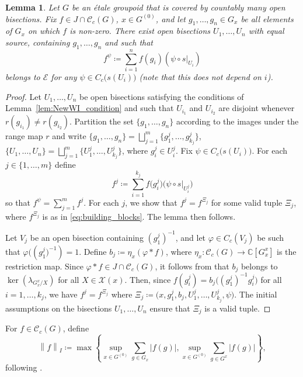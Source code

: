 \documentclass[11pt, oneside, reqno]{amsart}
\newcommand{\Gu}{G^{(0)}}
\newcommand{\cg}{\mathscr{C}_c(G)}
\newcommand{\abs}[1]{\left\vert#1\right\vert}
\newcommand{\norm}[1]{\left\|#1\right\|}
\newtheorem{lem}[thm]{Lemma}
\theoremstyle{definition}
\theoremstyle{remark}
\numberwithin{equation}{section}
\begin{document}
\begin{lem}\label{lem:RestrictJcg}
    Let $G$ be an \'etale groupoid that is covered by countably many open bisections.
    Fix $f \in J \cap \cg$, $x \in \Gu$, and let $g_1, \dotsc, g_n \in G_{x}$ be all elements of $G_{x}$ on which $f$ is non-zero. There exist open bisections $U_1, \dots, U_n$ with equal source, containing $g_1, \dots, g_n$ and such that
    \[
    f^\psi \coloneq \sum_{i = 1}^n f(g_i) (\psi \circ s \vert_{U_i})
    \]
    belongs to $\mathcal{E}$ for any $\psi \in C_c\big(s(U_i)\big)$ (note that this does not depend on $i$).
\end{lem}

\begin{proof}
    Let $U_1, \dots, U_n$ be open bisections satisfying the conditions of Lemma~\ref{lem:NewWI_condition} and such that $U_{i_1}$ and $U_{i_2}$ are disjoint whenever $r(g_{i_1}) \neq r(g_{i_2})$. Partition the set $\{g_1, \dots, g_n\}$ according to the images under the range map $r$ and write $\{g_1, \dots, g_n\} = \bigsqcup_{j=1}^m \{g^j_1, \dots, g^j_{k_j}\}$, $\{U_1, \dots, U_n\} = \bigsqcup_{j=1}^m \{U^j_1, \dots, U^j_{k_j}\}$, where $g_i^j \in U_i^j$. Fix $\psi \in C_c\big(s(U_i)\big)$. For each $j \in \{1, \dots, m\}$ define
    \[
    f^j \coloneq \sum_{i = 1}^{k_j} f\big( g^j_i \big) \big(\psi \circ s \vert_{U^j_i}\big)
    \]
    so that $f^{\psi} = \sum_{j=1}^m f^j$. For each $j$, we show that $f^j = f^{\Xi_j}$ for some valid tuple $\Xi_j$, where $f^{\Xi_j}$ is as in \eqref{eq:building_blocks}. The lemma then follows.
    
    Let $V_j$ be an open bisection containing ${(g^j_1)}^{-1}$, and let $\varphi \in C_c(V_j)$ be such that $\varphi\big(({g^j_1}\big)^{-1}) = 1$. Define $b_j \coloneq \eta_x(\varphi * f)$, where $ \eta_x \colon \cg \to \mathbb{C}[G^x_x]$ is the restriction map. Since $\varphi * f \in J \cap \cg$, it follows from \cite[Proposition~5.19]{Hume} that $b_j$ belongs to $\ker(\lambda_{G^x_x/X})$ for all $X \in \mathcal{X}(x)$. Then, since $f(g_i^j) = b_j\big( {(g^j_1)}^{-1} g^j_i \big)$ for all $i = 1, \dots, k_j$, we have $f^j = f^{\Xi_j}$ where $\Xi_j \coloneq \big(x, g_1^j, b_j, U^j_1, \dots, U^j_{k_j}, \psi \big)$. The initial assumptions on the bisections $U_1, \dots, U_n$ ensure that $\Xi_j$ is a valid tuple.
\end{proof}

For $f \in \cg$, define
\begin{equation}\label{eq:Inorm}
\norm{f}_I \coloneq \max\left\{ \sup_{x \in \Gu} \sum_{g \in G_x} \abs{f(g)} , \sup_{x \in \Gu} \sum_{g \in G^x} \abs{f(g)} \right\},
\end{equation}
following \cite{Hahn}.
\end{document}
